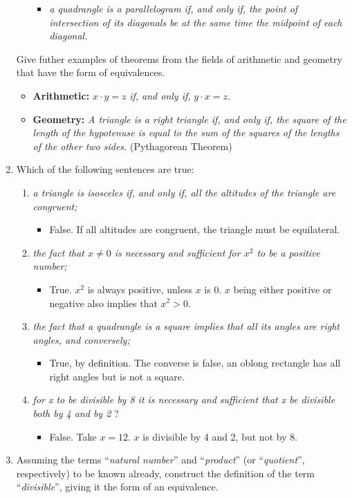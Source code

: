 \begin{enumerate}
\begin{itemize}
    \begin{itemize}
    \item \emph{a quadrangle is a parallelogram if, and only if, the
        point of intersection of its diagonals be at the same time the
        midpoint of each diagonal.}
    \end{itemize}
  \end{itemize}
  Give futher examples of theorems from the fields of arithmetic and
  geometry that have the form of equivalences.
  \begin{itemize}
  \item \textbf{Arithmetic:} $x{\cdot}y=z$ \emph{if, and only if,}
    $y{\cdot}x=z$. 
  \item \textbf{Geometry:} \emph{A triangle is a right triangle if,
      and only if, the square of the length of the hypotenuse is equal
      to the sum of the squares of the lengths of the other two
      sides.} (Pythagorean Theorem)
  \end{itemize}
\item Which of the following sentences are true:
  \begin{enumerate}
  \item \emph{a triangle is isosceles if, and only if, all the
      altitudes of the triangle are congruent;}
    \begin{itemize}
    \item False.  If all altitudes are congruent, the triangle must be
      equilateral.
    \end{itemize}
  \item \emph{the fact that $x \neq 0$ is necessary and sufficient for
      $x^2$ to be a positive number;}
    \begin{itemize}
    \item True.  $x^2$ is always positive, unless $x$ is 0.  $x$ being
      either positive or negative also implies that $x^2 > 0$.
    \end{itemize}
  \item \emph{the fact that a quadrangle is a square implies that all
      its angles are right angles, and conversely;}
    \begin{itemize}
    \item True, by definition.  The converse is false, an oblong
      rectangle has all right angles but is not a square.
    \end{itemize}
  \item \emph{for x to be divisible by 8 it is necessary and
      sufficient that x be divisible both by 4 and by 2} \quad ?
    \begin{itemize}
    \item False.  Take $x=12$.  $x$ is divisible by 4 and 2, but
      not by 8.
    \end{itemize}
  \end{enumerate}
\item Assuming the terms ``\emph{natural number}'' and ``\emph{product}'' (or
  ``\emph{quotient}'', respectively) to be known already, construct the
  definition of the term ``\emph{divisible}'', giving it the form of an
  equivalence.


\end{enumerate}
